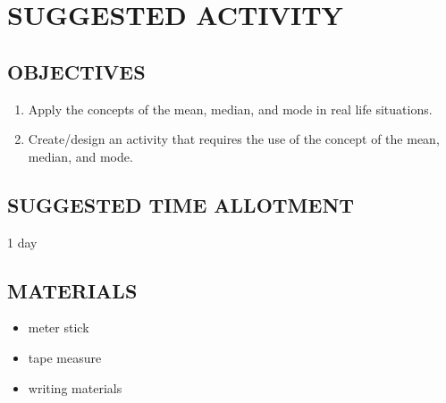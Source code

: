 \section*{SUGGESTED ACTIVITY}
\subsection*{OBJECTIVES}
\begin{enumerate}
\item Apply the concepts of the mean, median, and mode in real life situations.
\item Create/design an activity that requires the use of the concept of the mean, median, and mode.
\end{enumerate}
\subsection*{SUGGESTED TIME ALLOTMENT}
1 day
\subsection*{MATERIALS}
\begin{itemize}
\item meter stick
\item tape measure
\item writing materials
\end{itemize}
